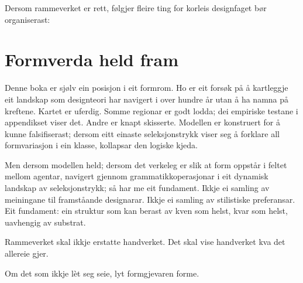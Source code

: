 Dersom rammeverket er rett, følgjer fleire ting for korleis designfaget bør organiserast:





\section*{Formverda held fram}

Denne boka er sjølv ein posisjon i eit formrom. Ho er eit forsøk på å kartleggje eit landskap som designteori har navigert i over hundre år utan å ha namna på kreftene. Kartet er uferdig. Somme regionar er godt lodda; dei empiriske testane i appendikset viser det. Andre er knapt skisserte. Modellen er konstruert for å kunne falsifiserast; dersom eitt einaste seleksjonstrykk viser seg å forklare all formvariasjon i ein klasse, kollapsar den logiske kjeda.

Men dersom modellen held; dersom det verkeleg er slik at form oppstår i feltet mellom agentar, navigert gjennom grammatikkoperasjonar i eit dynamisk landskap av seleksjonstrykk; så har me eit fundament. Ikkje ei samling av meiningane til framståande designarar. Ikkje ei samling av stilistiske preferansar. Eit fundament: ein struktur som kan berast av kven som helst, kvar som helst, uavhengig av substrat.

Rammeverket skal ikkje erstatte handverket. Det skal vise handverket kva det allereie gjer.

Om det som ikkje lèt seg seie, lyt formgjevaren forme.
